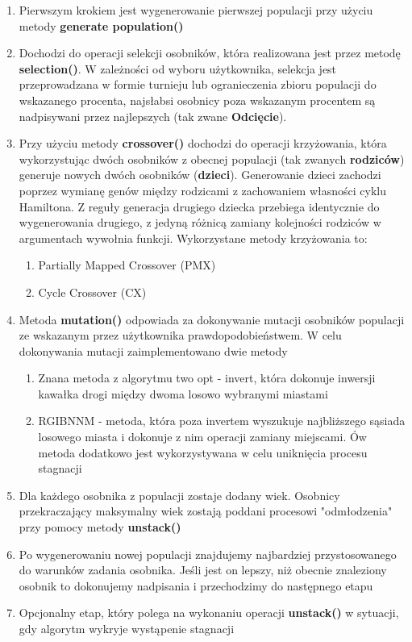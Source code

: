  \begin{enumerate}
    \item Pierwszym krokiem jest wygenerowanie pierwszej populacji przy użyciu metody \textbf{generate population()}
    \item Dochodzi do operacji selekcji osobników, która realizowana jest przez metodę \textbf{selection()}. 
    W zależności od wyboru użytkownika, selekcja jest przeprowadzana w formie turnieju lub ogranieczenia zbioru populacji do wskazanego procenta, najsłabsi osobnicy poza wskazanym procentem są nadpisywani przez najlepszych (tak zwane \textbf{Odcięcie}).
    \item Przy użyciu metody \textbf{crossover()} dochodzi do operacji krzyżowania, która wykorzystując dwóch osobników z obecnej populacji (tak zwanych \textbf{rodziców}) generuje nowych dwóch osobników (\textbf{dzieci}).
    Generowanie dzieci zachodzi poprzez wymianę genów między rodzicami z zachowaniem własności cyklu Hamiltona. Z reguły generacja drugiego dziecka przebiega identycznie do wygenerowania drugiego,
    z jedyną różnicą zamiany kolejności rodziców w argumentach wywołnia funkcji. Wykorzystane metody krzyżowania to:
    \begin{enumerate}
      \item Partially Mapped Crossover (PMX)
      \item Cycle Crossover (CX)
    \end{enumerate}
    \item Metoda \textbf{mutation()} odpowiada za dokonywanie mutacji osobników populacji ze wskazanym przez użytkownika prawdopodobieństwem.
    W celu dokonywania mutacji zaimplementowano dwie metody
    \begin{enumerate}
      \item Znana metoda z algorytmu two opt - invert, która dokonuje inwersji kawałka drogi między dwoma losowo wybranymi miastami
      \item RGIBNNM - metoda, która poza invertem wyszukuje najbliższego sąsiada losowego miasta i dokonuje z nim operacji zamiany miejscami. Ów metoda dodatkowo jest
      wykorzystywana w celu uniknięcia procesu stagnacji
    \end{enumerate}
    \item Dla każdego osobnika z populacji zostaje dodany wiek. Osobnicy przekraczający maksymalny wiek zostają poddani procesowi "odmłodzenia" przy pomocy metody \textbf{unstack()}
    \item Po wygenerowaniu nowej populacji znajdujemy najbardziej przystosowanego do warunków zadania osobnika. Jeśli jest on lepszy, niż obecnie znaleziony osobnik
    to dokonujemy nadpisania i przechodzimy do następnego etapu
    \item Opcjonalny etap, który polega na wykonaniu operacji \textbf{unstack()} w sytuacji, gdy algorytm wykryje wystąpenie stagnacji
  \end{enumerate}
